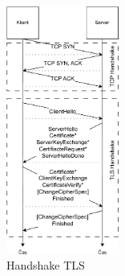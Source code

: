 \begin{figure}
	\centering
	\includegraphics[width=0.33\textwidth]{obrazky-figures/tls-handshake.pdf}
	\caption{Handshake TLS}
	\label{fig:tls-handshake}
\end{figure}
\FloatBarrier

